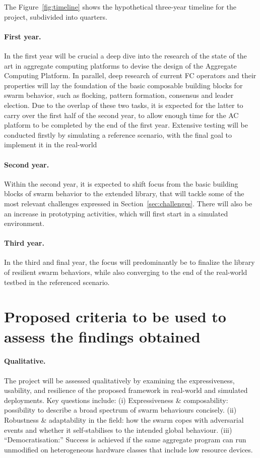 \documentclass[12pt]{article}
\begin{document}
The Figure~\ref{fig:timeline} shows the hypothetical three-year timeline for the project, subdivided into quarters.

\paragraph{First year.} In the first year will be crucial a deep dive into the research of the state of the art in aggregate computing platforms to devise the design of the Aggregate Computing Platform.
In parallel, deep research of current FC operators and their properties will lay the foundation of the basic composable building blocks for swarm behavior, such as flocking, pattern formation, consensus and leader election.
Due to the overlap of these two tasks, it is expected for the latter to carry over the first half of the second year, to allow enough time for the AC platform to be completed by the end of the first year.
Extensive testing will be conducted firstly by simulating a reference scenario, with the final goal to implement it in the real-world

\paragraph{Second year.} Within the second year, it is expected to shift focus from the basic building blocks of swarm behavior to the extended library, that will tackle some of the most relevant challenges expressed in Section~\ref{sec:challenges}.
There will also be an increase in prototyping activities, which will first start in a simulated environment.

\paragraph{Third year.} In the third and final year, the focus will predominantly be to finalize the library of resilient swarm behaviors, while also converging to the end of the real-world testbed in the referenced scenario.

\section{Proposed criteria to be used to assess the findings obtained}

\paragraph{Qualitative.}
The project will be assessed qualitatively by examining the expressiveness, usability, and resilience of the proposed framework in real-world and simulated deployments.  
Key questions include:  
(i) Expressiveness \& composability: possibility to describe a broad spectrum of swarm behaviours concisely. 
(ii) Robustness \& adaptability in the field: how the swarm copes with adversarial events and whether it self‑stabilises to the intended global behaviour.  
(iii) “Democratisation:” Success is achieved if the same aggregate program can run unmodified on heterogeneous hardware classes that include low resource devices.
\end{document}
